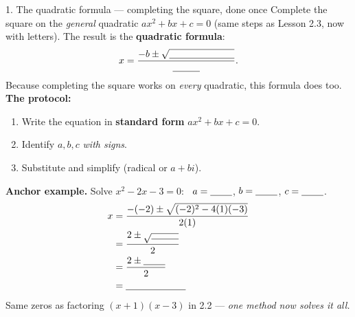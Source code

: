 \documentclass[10pt]{article}
\begin{document}
\begin{notesbox}{1. The quadratic formula --- completing the square, done once}
Complete the square on the \emph{general} quadratic $ax^2+bx+c=0$ (same steps as Lesson 2.3, now with
letters). The result is the \textbf{quadratic formula}:
\[ x=\frac{-b\pm\sqrt{\rule{0pt}{1.6ex}\blank{2.4cm}}}{\blank{1.0cm}}. \]
Because completing the square works on \emph{every} quadratic, this formula does too. \textbf{The protocol:}
\begin{enumerate}[leftmargin=1.7em, itemsep=1pt]
  \item Write the equation in \textbf{standard form} $ax^2+bx+c=0$.
  \item Identify $a,b,c$ \emph{with signs}.
  \item Substitute and simplify (radical or $a+bi$).
\end{enumerate}
\textbf{Anchor example.} Solve $x^2-2x-3=0$: \ $a=\blank{0.8cm}$, $b=\blank{0.8cm}$, $c=\blank{0.8cm}$.
\[
\begin{aligned}
  x &= \frac{-(-2)\pm\sqrt{(-2)^2-4(1)(-3)}}{2(1)} \\
    &= \frac{2\pm\sqrt{\blank{1.0cm}}}{2} \\
    &= \frac{2\pm\blank{0.8cm}}{2} \\
    &= \blank{2.2cm}
\end{aligned}
\]
Same zeros as factoring $(x+1)(x-3)$ in 2.2 --- \emph{one method now solves it all.}
\end{notesbox}
\end{document}
